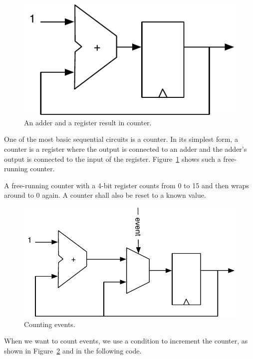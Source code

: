 \documentclass[%
    10pt,
    headinclude, footexclude,
    openright, %
    notitlepage,
    cleardoubleempty,
    headsepline,
    pointlessnumbers,
    bibtotoc, idxtotoc,
    ]{scrbook}
\newcommand{\scale}{0.7}
\begin{document}
\begin{figure}
  \centering
  \includegraphics[scale=\scale]{figures/counter}
  \caption{An adder and a register result in counter.}
  \label{fig:counter}
\end{figure}

One of the most basic sequential circuits is a counter. In its simplest form, a counter is a register
where the output is connected to an adder and the adder's output is connected to the input
of the register. Figure~\ref{fig:counter} shows such a free-running counter.

A free-running counter with a 4-bit register counts from 0 to 15 and then wraps around
to 0 again. A counter shall also be reset to a known value.


\begin{figure}
  \centering
  \includegraphics[scale=\scale]{figures/event-counter}
  \caption{Counting events.}
  \label{fig:event-counter}
\end{figure}

\noindent When we want to count events, we use a condition to increment the counter,
as shown in Figure~\ref{fig:event-counter} and in the following code.
\end{document}
